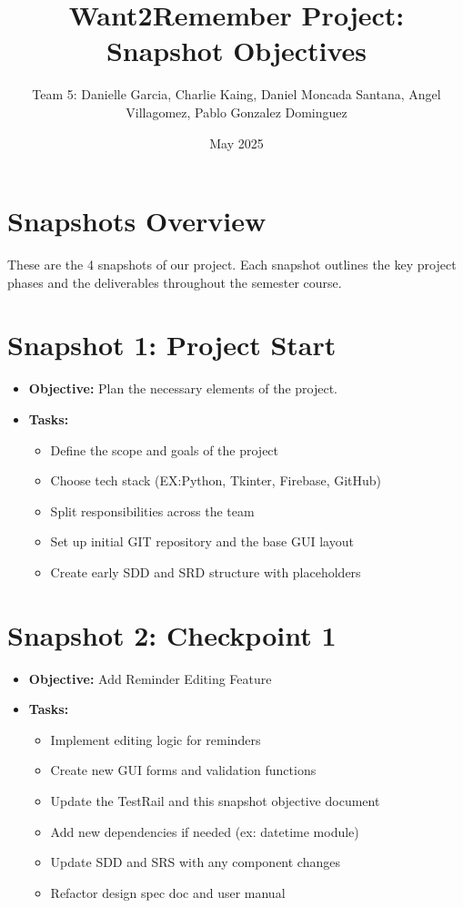 \documentclass{article}
\title{Want2Remember Project: Snapshot Objectives}
\author{Team 5: Danielle Garcia, Charlie Kaing, Daniel Moncada Santana, Angel Villagomez, Pablo Gonzalez Dominguez}
\date{May 2025}
\begin{document}
\maketitle

\section*{Snapshots Overview}
These are the 4 snapshots of our project. Each snapshot outlines the key project phases and the deliverables throughout the semester course.

\section*{Snapshot 1: Project Start}
\begin{itemize}
\item \textbf{Objective:} Plan the necessary elements of the project.
\item \textbf{Tasks:}
\begin{itemize}
\item Define the scope and goals of the project
\item Choose tech stack (EX:Python, Tkinter, Firebase, GitHub)
\item Split responsibilities across the team
\item Set up initial GIT repository and the base GUI layout
\item Create early SDD and SRD structure with placeholders
\end{itemize}
\end{itemize}

\section*{Snapshot 2: Checkpoint 1}
\begin{itemize}
\item \textbf{Objective:} Add Reminder Editing Feature
\item \textbf{Tasks:}
\begin{itemize}
\item Implement editing logic for reminders
\item Create new GUI forms and validation functions
\item Update the TestRail and this snapshot objective document
\item Add new dependencies if needed (ex: datetime module)
\item Update SDD and SRS with any component changes
\item Refactor design spec doc and user manual
\end{itemize}
\end{itemize}
\end{document}
